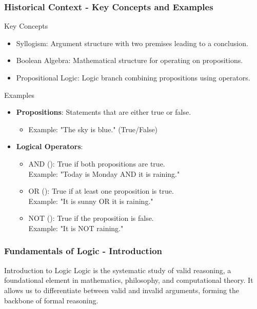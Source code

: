 \documentclass[aspectratio=169]{beamer}
\begin{document}
\begin{frame}[fragile]
    \frametitle{Historical Context - Key Concepts and Examples}
    \begin{block}{Key Concepts}
        \begin{itemize}
            \item Syllogism: Argument structure with two premises leading to a conclusion.
            \item Boolean Algebra: Mathematical structure for operating on propositions.
            \item Propositional Logic: Logic branch combining propositions using operators.
        \end{itemize}
    \end{block}
    
    \begin{block}{Examples}
        \begin{itemize}
            \item \textbf{Propositions}: Statements that are either true or false.
            \begin{itemize}
                \item Example: "The sky is blue." (True/False)
            \end{itemize}
            \item \textbf{Logical Operators}:
            \begin{itemize}
                \item AND (\land): True if both propositions are true.\\
                      Example: "Today is Monday AND it is raining."
                \item OR (\lor): True if at least one proposition is true.\\
                      Example: "It is sunny OR it is raining."
                \item NOT (\neg): True if the proposition is false.\\
                      Example: "It is NOT raining."
            \end{itemize}
        \end{itemize}
    \end{block}
\end{frame}

\begin{frame}[fragile]
    \frametitle{Fundamentals of Logic - Introduction}
    \begin{block}{Introduction to Logic}
        Logic is the systematic study of valid reasoning, a foundational element in mathematics, philosophy, and computational theory. 
        It allows us to differentiate between valid and invalid arguments, forming the backbone of formal reasoning.
    \end{block}
\end{frame}
\end{document}
